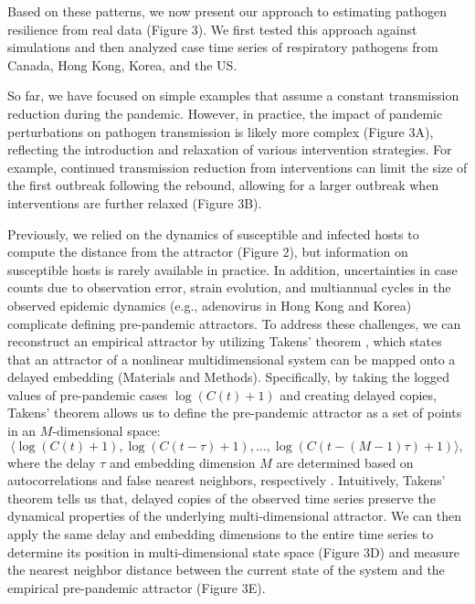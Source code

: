 \documentclass[12pt]{article}
\begin{document}
Based on these patterns, we now present our approach to estimating pathogen resilience from real data (Figure 3).
We first tested this approach against simulations and then analyzed case time series of respiratory pathogens from Canada, Hong Kong, Korea, and the US.

So far, we have focused on simple examples that assume a constant transmission reduction during the pandemic.
However, in practice, the impact of pandemic perturbations on pathogen transmission is likely more complex (Figure 3A), reflecting the introduction and relaxation of various intervention strategies.
For example, continued transmission reduction from interventions can limit the size of the first outbreak following the rebound, allowing for a larger outbreak when interventions are further relaxed (Figure 3B).

Previously, we relied on the dynamics of susceptible and infected hosts to compute the distance from the attractor (Figure 2), but information on susceptible hosts is rarely available in practice.
In addition, uncertainties in case counts due to observation error, strain evolution, and multiannual cycles in the observed epidemic dynamics (e.g., adenovirus in Hong Kong and Korea) complicate defining pre-pandemic attractors.
To address these challenges, we can reconstruct an empirical attractor by utilizing Takens' theorem \citep{takens2006detecting}, which states that an attractor of a nonlinear multidimensional system can be mapped onto a delayed embedding (Materials and Methods).
Specifically, by taking the logged values of pre-pandemic cases $\log(C(t)+1)$ and creating delayed copies, Takens' theorem allows us to define the pre-pandemic attractor as a set of points in an $M$-dimensional space:
\begin{equation}
\langle\log(C(t)+1), \log(C(t-\tau)+1), \dots, \log(C(t-(M-1)\tau)+1)\rangle,
\end{equation}
where the delay $\tau$ and embedding dimension $M$ are determined based on autocorrelations and false nearest neighbors, respectively \citep{kennel1992determining,tan2023selecting}.
Intuitively, Takens’ theorem tells us that, delayed copies of the observed time series preserve the dynamical properties of the underlying multi-dimensional attractor.
We can then apply the same delay and embedding dimensions to the entire time series to determine its position in multi-dimensional state space (Figure 3D) and measure the nearest neighbor distance between the current state of the system and the empirical pre-pandemic attractor (Figure 3E).
\end{document}

